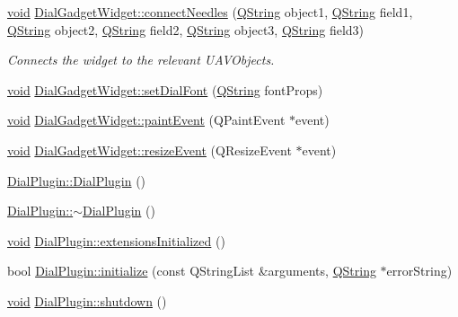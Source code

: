 \begin{DoxyCompactItemize}
\item 
\hyperlink{group___u_a_v_objects_plugin_ga444cf2ff3f0ecbe028adce838d373f5c}{void} \hyperlink{group___dial_plugin_ga4b039739f70d00651a6ca39cf5a1997a}{\-Dial\-Gadget\-Widget\-::connect\-Needles} (\hyperlink{group___u_a_v_objects_plugin_gab9d252f49c333c94a72f97ce3105a32d}{\-Q\-String} object1, \hyperlink{group___u_a_v_objects_plugin_gab9d252f49c333c94a72f97ce3105a32d}{\-Q\-String} field1, \hyperlink{group___u_a_v_objects_plugin_gab9d252f49c333c94a72f97ce3105a32d}{\-Q\-String} object2, \hyperlink{group___u_a_v_objects_plugin_gab9d252f49c333c94a72f97ce3105a32d}{\-Q\-String} field2, \hyperlink{group___u_a_v_objects_plugin_gab9d252f49c333c94a72f97ce3105a32d}{\-Q\-String} object3, \hyperlink{group___u_a_v_objects_plugin_gab9d252f49c333c94a72f97ce3105a32d}{\-Q\-String} field3)
\begin{DoxyCompactList}\small\item\em \-Connects the widget to the relevant \-U\-A\-V\-Objects. \end{DoxyCompactList}\item 
\hyperlink{group___u_a_v_objects_plugin_ga444cf2ff3f0ecbe028adce838d373f5c}{void} \hyperlink{group___dial_plugin_ga47e399b79845057cc9f7eab02fef380a}{\-Dial\-Gadget\-Widget\-::set\-Dial\-Font} (\hyperlink{group___u_a_v_objects_plugin_gab9d252f49c333c94a72f97ce3105a32d}{\-Q\-String} font\-Props)
\item 
\hyperlink{group___u_a_v_objects_plugin_ga444cf2ff3f0ecbe028adce838d373f5c}{void} \hyperlink{group___dial_plugin_ga35b76a1088cc50996f66ef23da926785}{\-Dial\-Gadget\-Widget\-::paint\-Event} (\-Q\-Paint\-Event $\ast$event)
\item 
\hyperlink{group___u_a_v_objects_plugin_ga444cf2ff3f0ecbe028adce838d373f5c}{void} \hyperlink{group___dial_plugin_ga4ce19a0118b1518cf0469e2fc69dc86b}{\-Dial\-Gadget\-Widget\-::resize\-Event} (\-Q\-Resize\-Event $\ast$event)
\item 
\hyperlink{group___dial_plugin_ga414d0b2d29e6c9d41df85ac25e1899fa}{\-Dial\-Plugin\-::\-Dial\-Plugin} ()
\item 
\hyperlink{group___dial_plugin_gaea6ec646d171578f8a22d63b9b28016c}{\-Dial\-Plugin\-::$\sim$\-Dial\-Plugin} ()
\item 
\hyperlink{group___u_a_v_objects_plugin_ga444cf2ff3f0ecbe028adce838d373f5c}{void} \hyperlink{group___dial_plugin_gac703254d72e140e8ff7b4c23ddb46020}{\-Dial\-Plugin\-::extensions\-Initialized} ()
\item 
bool \hyperlink{group___dial_plugin_ga59561e7e0f5635938f8b83931c025b67}{\-Dial\-Plugin\-::initialize} (const \-Q\-String\-List \&arguments, \hyperlink{group___u_a_v_objects_plugin_gab9d252f49c333c94a72f97ce3105a32d}{\-Q\-String} $\ast$error\-String)
\item 
\hyperlink{group___u_a_v_objects_plugin_ga444cf2ff3f0ecbe028adce838d373f5c}{void} \hyperlink{group___dial_plugin_ga096efc39bed83964551f3a4a8bd1a29d}{\-Dial\-Plugin\-::shutdown} ()
\end{DoxyCompactItemize}
